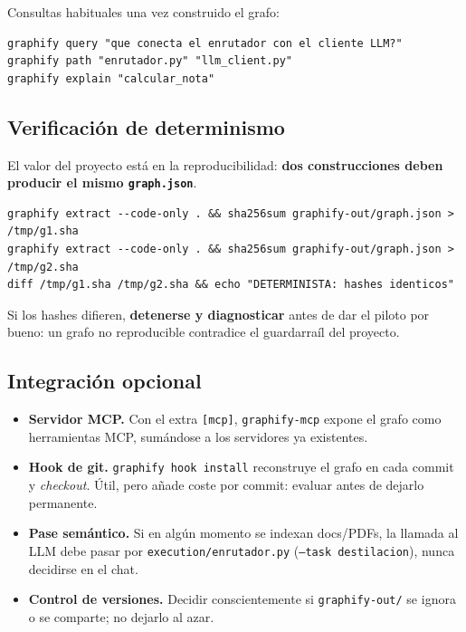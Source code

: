 \documentclass[11pt,a4paper]{article}
\begin{document}
Consultas habituales una vez construido el grafo:

\begin{lstlisting}
graphify query "que conecta el enrutador con el cliente LLM?"
graphify path "enrutador.py" "llm_client.py"
graphify explain "calcular_nota"
\end{lstlisting}

\subsection{Verificación de determinismo}

El valor del proyecto está en la reproducibilidad: \textbf{dos construcciones deben
producir el mismo \texttt{graph.json}}.

\begin{lstlisting}
graphify extract --code-only . && sha256sum graphify-out/graph.json > /tmp/g1.sha
graphify extract --code-only . && sha256sum graphify-out/graph.json > /tmp/g2.sha
diff /tmp/g1.sha /tmp/g2.sha && echo "DETERMINISTA: hashes identicos"
\end{lstlisting}

Si los hashes difieren, \textbf{detenerse y diagnosticar} antes de dar el piloto por
bueno: un grafo no reproducible contradice el guardarraíl del proyecto.

\subsection{Integración opcional}

\begin{itemize}[leftmargin=1.4em]
    \item \textbf{Servidor MCP.} Con el extra \texttt{[mcp]}, \texttt{graphify-mcp}
    expone el grafo como herramientas MCP, sumándose a los servidores ya existentes.
    \item \textbf{Hook de git.} \texttt{graphify hook install} reconstruye el grafo en cada
    commit y \emph{checkout}. Útil, pero añade coste por commit: evaluar antes de dejarlo
    permanente.
    \item \textbf{Pase semántico.} Si en algún momento se indexan docs/PDFs, la llamada al
    LLM debe pasar por \texttt{execution/enrutador.py} (\texttt{--task destilacion}), nunca
    decidirse en el chat.
    \item \textbf{Control de versiones.} Decidir conscientemente si \texttt{graphify-out/}
    se ignora o se comparte; no dejarlo al azar.
\end{itemize}
\end{document}
